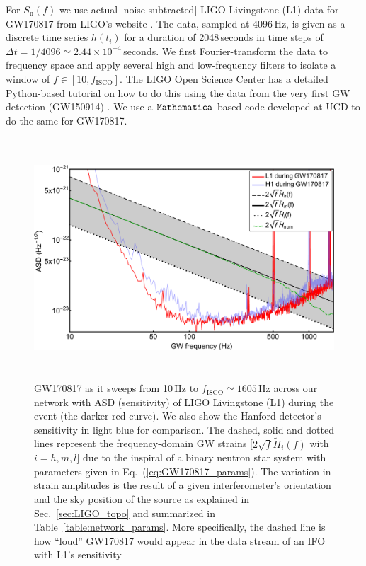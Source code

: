 \documentclass[prd,amsmath,amssymb,aps,floats,amsfonts,notitlepage,superscriptaddress,eqsecnum,nofootinbib,10pt]{revtex4-1}
\begin{document}
For $S_\text{n}(f)$ we use actual [noise-subtracted] LIGO-Livingstone (L1) data for GW170817 from LIGO's website \cite{LIGO_L1_data}.
The data, sampled at 4096\,Hz, is given as a discrete time series $h(t_i)$ for a duration of 2048\,seconds in time steps of $\Delta t=1/4096\simeq 2.44\times 10^{-4}\,$seconds.
We first Fourier-transform the data to frequency space and apply several high and low-frequency filters to isolate a window of $f\in [10, f_\text{ISCO}]$.
The LIGO Open Science Center has a detailed Python-based tutorial on how to do this using the data from the very first GW detection (GW150914) \cite{LIGO_tutorial}. 
We use a $\verb|Mathematica|$ based code developed at UCD to do the same for GW170817.
%
\begin{figure}[ht!]
\includegraphics[height=9cm]{../Figures/GW170817_strains.pdf}
\caption{GW170817 as it sweeps from 10\,Hz to $f_\text{ISCO} \simeq1605\,$Hz across our network with ASD (sensitivity) of 
LIGO Livingstone (L1) during the event (the darker red curve).
We also show the Hanford detector's sensitivity in light blue for comparison. The dashed, solid and dotted lines represent the 
frequency-domain GW strains [$2\sqrt{f} \tilde{H}_i(f)$ with $i=h,m,l$] due to the inspiral of
a binary neutron star system with parameters given in Eq.~(\ref{eq:GW170817_params}).
The variation in strain amplitudes is the result of a given interferometer's orientation and the sky position of the source 
as explained in Sec.~\ref{sec:LIGO_topo} and summarized in Table~\ref{table:network_params}.
More specifically, the dashed line is how ``loud'' GW170817 would appear in the data stream of an IFO with L1's sensitivity
}
\end{figure}
\end{document}
